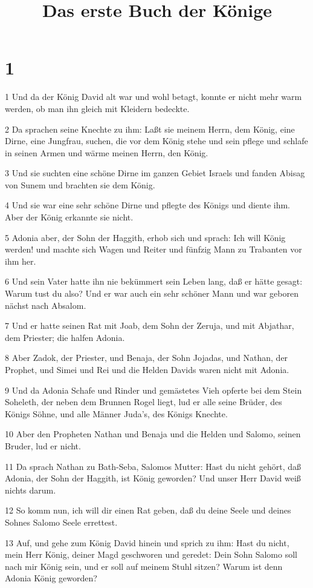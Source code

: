 

\title{Das erste Buch der Könige}


\chapter{1}

\par 1 Und da der König David alt war und wohl betagt, konnte er nicht mehr warm werden, ob man ihn gleich mit Kleidern bedeckte.
\par 2 Da sprachen seine Knechte zu ihm: Laßt sie meinem Herrn, dem König, eine Dirne, eine Jungfrau, suchen, die vor dem König stehe und sein pflege und schlafe in seinen Armen und wärme meinen Herrn, den König.
\par 3 Und sie suchten eine schöne Dirne im ganzen Gebiet Israels und fanden Abisag von Sunem und brachten sie dem König.
\par 4 Und sie war eine sehr schöne Dirne und pflegte des Königs und diente ihm. Aber der König erkannte sie nicht.
\par 5 Adonia aber, der Sohn der Haggith, erhob sich und sprach: Ich will König werden! und machte sich Wagen und Reiter und fünfzig Mann zu Trabanten vor ihm her.
\par 6 Und sein Vater hatte ihn nie bekümmert sein Leben lang, daß er hätte gesagt: Warum tust du also? Und er war auch ein sehr schöner Mann und war geboren nächst nach Absalom.
\par 7 Und er hatte seinen Rat mit Joab, dem Sohn der Zeruja, und mit Abjathar, dem Priester; die halfen Adonia.
\par 8 Aber Zadok, der Priester, und Benaja, der Sohn Jojadas, und Nathan, der Prophet, und Simei und Rei und die Helden Davids waren nicht mit Adonia.
\par 9 Und da Adonia Schafe und Rinder und gemästetes Vieh opferte bei dem Stein Soheleth, der neben dem Brunnen Rogel liegt, lud er alle seine Brüder, des Königs Söhne, und alle Männer Juda's, des Königs Knechte.
\par 10 Aber den Propheten Nathan und Benaja und die Helden und Salomo, seinen Bruder, lud er nicht.
\par 11 Da sprach Nathan zu Bath-Seba, Salomos Mutter: Hast du nicht gehört, daß Adonia, der Sohn der Haggith, ist König geworden? Und unser Herr David weiß nichts darum.
\par 12 So komm nun, ich will dir einen Rat geben, daß du deine Seele und deines Sohnes Salomo Seele errettest.
\par 13 Auf, und gehe zum König David hinein und sprich zu ihm: Hast du nicht, mein Herr König, deiner Magd geschworen und geredet: Dein Sohn Salomo soll nach mir König sein, und er soll auf meinem Stuhl sitzen? Warum ist denn Adonia König geworden?
